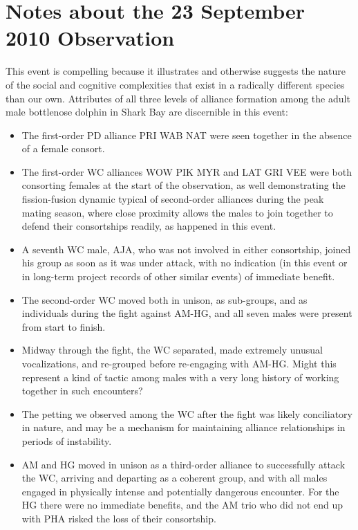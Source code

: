 \documentclass[11pt]{amsart}
\begin{document}
\section{Notes about the 23 September 2010 Observation}

This event is compelling because it illustrates and otherwise suggests the nature of the social and cognitive complexities that exist in a radically different species than our own.  Attributes of all three levels of alliance formation among the adult male bottlenose dolphin in Shark Bay are discernible in this event: 
\begin{itemize}
\item{The first-order PD alliance PRI WAB NAT were seen together in the absence of a female consort. } %
\item{The first-order WC alliances WOW PIK MYR and LAT GRI VEE were both consorting females at the start of the observation, as well demonstrating the fission-fusion dynamic typical of second-order alliances during the peak mating season, where close proximity allows the males to join together to defend their consortships readily, as happened in this event.} %
\item{A seventh WC male, AJA, who was not involved in either consortship, joined his group as soon as it was under attack, with no indication (in this event or in long-term project records of other similar events) of immediate benefit.} %
\item{The second-order WC moved both in unison, as sub-groups, and as individuals during the fight against AM-HG, and all seven males were present from start to finish.} %
\item{Midway through the fight, the WC separated, made extremely unusual vocalizations, and re-grouped before re-engaging with AM-HG. Might this represent a kind of tactic among males with a very long history of working together in such encounters?} %
\item{The petting we observed among the WC after the fight was likely conciliatory in nature, and may be a mechanism for maintaining alliance relationships in periods of instability. } %
\item{AM and HG moved in unison as a third-order alliance to successfully attack the WC, arriving and departing as a coherent group, and with all males engaged in physically intense and potentially dangerous encounter. For the HG there were no immediate benefits, and the AM trio who did not end up with PHA risked the loss of their consortship.} %

\end{itemize}
\end{document}
